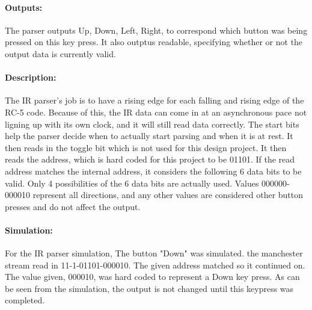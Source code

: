 \documentclass[]{article}
\begin{document}
\paragraph{Outputs:} The parser outputs Up, Down, Left, Right, to correspond which button was being pressed on this key press. It also outptus readable, specifying whether or not the output data is currently valid.
\paragraph{Description:} The IR parser's job is to have a rising edge for each falling and rising edge of the RC-5 code. Because of this, the IR data can come in at an asynchronous pace not ligning up with its own clock, and it will still read data correctly. 
The start bits help the parser decide when to actually start parsing and when it is at rest. It then reads in the toggle bit which is not used for this design project. It then reads the address, which is  hard coded for this project to be 01101. If the read address matches the internal address, it considers the following 6 data bits to be valid.
Only 4 possibilities of the 6 data bits are actually used. Values 000000-000010 represent all directions, and any other values are considered other button presses and do not affect the output.
\paragraph{Simulation:} For the IR parser simulation, The button "Down" was simulated. the manchester stream read in 11-1-01101-000010. The given address matched so it continued on. The value given, 000010, was hard coded to represent a Down key press. As can be seen from the simulation, the output is not changed until this keypress was completed.
\end{document}
